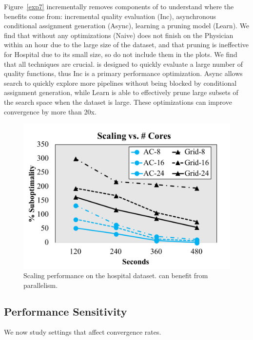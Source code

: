 Figure~\ref{exp7} incrementally removes components of \sys to understand where the benefits come from:  incremental quality evaluation (Inc), asynchronous conditional assignment generation (Async), learning a pruning model (Learn).  We find that \sys without any optimizations (Naive) does not finish on the Physician within an hour due to the large size of the dataset, and that pruning is ineffective for Hospital due to its small size, so do not include them in the plots.
We find that all techniques are crucial.  \sys is designed to quickly evaluate a large number of quality functions, thus Inc is a primary performance optimization. 
Async allows search to quickly explore more pipelines without being blocked by conditional assignment generation, while Learn is able to effectively prune large subsets of the search space when the dataset is large.
These optimizations can improve convergence by more than 20x.



\begin{figure}[t]
\centering
 \includegraphics[width=0.8\columnwidth]{exp/exp3.png}
 \caption{Scaling performance on the hospital dataset. \sys can benefit from parallelism. \label{exp3}}
\end{figure}

\subsection{\sys Performance Sensitivity}
We now study settings that affect \sys convergence rates.

